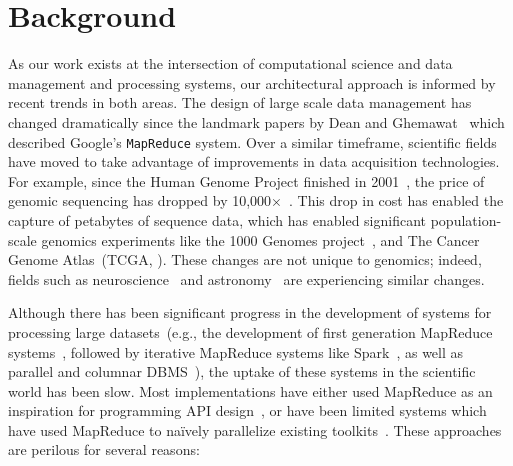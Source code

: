 \documentclass{acm_proc_article-sp}
\begin{document}
\section{Background}
\label{sec:background}

As our work exists at the intersection of computational science and data management and processing
systems, our architectural approach is informed by recent trends in both areas. The design of large
scale data management has changed dramatically since the landmark papers by Dean and
Ghemawat~\cite{dean04, dean08} which described Google's \texttt{MapReduce} system. Over a
similar timeframe, scientific fields have moved to take advantage of improvements in data acquisition
technologies. For example, since the Human Genome Project finished in 2001~\cite{lander01}, the price
of genomic sequencing has dropped by 10,000$\times$~\cite{nhgri}. This drop in cost has enabled the
capture of petabytes of sequence data, which has enabled significant population-scale genomics
experiments like the 1000 Genomes project~\cite{siva08}, and The Cancer Genome Atlas~(TCGA,
\cite{weinstein13}). These changes are not unique to genomics; indeed, fields such as
neuroscience~\cite{cunningham14} and astronomy~\cite{turk11} are experiencing similar changes.

Although there has been significant progress in the development of systems for processing large
datasets~(e.g., the development of first generation MapReduce systems~\cite{dean04}, followed by
iterative MapReduce systems like Spark~\cite{zaharia10}, as well as parallel and columnar
DBMS~\cite{abadi06, lamb12}), the uptake of these systems in the scientific world has been slow.
Most implementations have either used MapReduce as an inspiration for programming API
design~\cite{mckenna10}, or have been limited systems which have used MapReduce to na\"{i}vely
parallelize existing toolkits~\cite{langmead09, schatz09}. These approaches are perilous for several
reasons:
\end{document}
